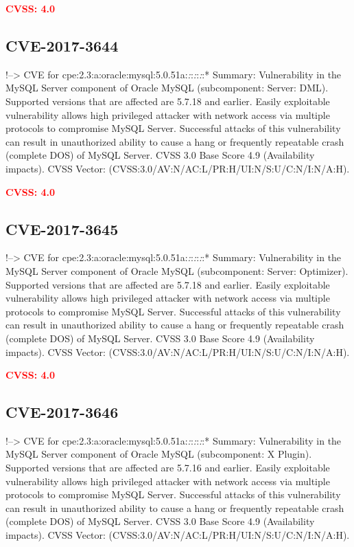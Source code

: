 \documentclass[a4paper, 12pt]{article}
\begin{document}
\textbf{\textcolor{red}{CVSS: 4.0}}

\hypertarget{cve-2017-3644}{%
\subsection{CVE-2017-3644}\label{cve-2017-3644}}

!--\textgreater{} CVE for
cpe:2.3:a:oracle:mysql:5.0.51a:\emph{:}:\emph{:}:\emph{:}:* Summary:
Vulnerability in the MySQL Server component of Oracle MySQL
(subcomponent: Server: DML). Supported versions that are affected are
5.7.18 and earlier. Easily exploitable vulnerability allows high
privileged attacker with network access via multiple protocols to
compromise MySQL Server. Successful attacks of this vulnerability can
result in unauthorized ability to cause a hang or frequently repeatable
crash (complete DOS) of MySQL Server. CVSS 3.0 Base Score 4.9
(Availability impacts). CVSS Vector:
(CVSS:3.0/AV:N/AC:L/PR:H/UI:N/S:U/C:N/I:N/A:H).

\textbf{\textcolor{red}{CVSS: 4.0}}

\hypertarget{cve-2017-3645}{%
\subsection{CVE-2017-3645}\label{cve-2017-3645}}

!--\textgreater{} CVE for
cpe:2.3:a:oracle:mysql:5.0.51a:\emph{:}:\emph{:}:\emph{:}:* Summary:
Vulnerability in the MySQL Server component of Oracle MySQL
(subcomponent: Server: Optimizer). Supported versions that are affected
are 5.7.18 and earlier. Easily exploitable vulnerability allows high
privileged attacker with network access via multiple protocols to
compromise MySQL Server. Successful attacks of this vulnerability can
result in unauthorized ability to cause a hang or frequently repeatable
crash (complete DOS) of MySQL Server. CVSS 3.0 Base Score 4.9
(Availability impacts). CVSS Vector:
(CVSS:3.0/AV:N/AC:L/PR:H/UI:N/S:U/C:N/I:N/A:H).

\textbf{\textcolor{red}{CVSS: 4.0}}

\hypertarget{cve-2017-3646}{%
\subsection{CVE-2017-3646}\label{cve-2017-3646}}

!--\textgreater{} CVE for
cpe:2.3:a:oracle:mysql:5.0.51a:\emph{:}:\emph{:}:\emph{:}:* Summary:
Vulnerability in the MySQL Server component of Oracle MySQL
(subcomponent: X Plugin). Supported versions that are affected are
5.7.16 and earlier. Easily exploitable vulnerability allows high
privileged attacker with network access via multiple protocols to
compromise MySQL Server. Successful attacks of this vulnerability can
result in unauthorized ability to cause a hang or frequently repeatable
crash (complete DOS) of MySQL Server. CVSS 3.0 Base Score 4.9
(Availability impacts). CVSS Vector:
(CVSS:3.0/AV:N/AC:L/PR:H/UI:N/S:U/C:N/I:N/A:H).
\end{document}
